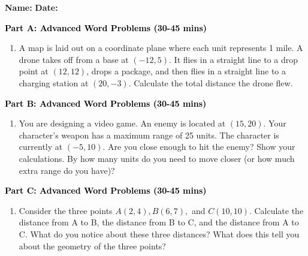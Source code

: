 \documentclass[12pt, letterpaper, fleqn]{article}
\begin{document}
\textbf{Name:} \underline{\hspace{5cm}}
\hfill
\textbf{Date:} \underline{\hspace{3cm}}\\


\begin{tcolorbox}[colback=customteal!20]
\large\textcolor{black}{\textbf{Part A: Advanced Word Problems (30-45 mins)}}
\end{tcolorbox}

\vspace{3mm}

\begin{enumerate}[itemsep=5.5cm, leftmargin=0.6cm]
\item A map is laid out on a coordinate plane where each unit represents 1 mile. A drone takes off from a base at $(-12, 5)$. It flies in a straight line to a drop point at $(12, 12)$, drops a package, and then flies in a straight line to a charging station at $(20, -3)$. Calculate the total distance the drone flew.
\end{enumerate}

\newpage

\begin{tcolorbox}[colback=customteal!20]
\large\textcolor{black}{\textbf{Part B: Advanced Word Problems (30-45 mins)}}
\end{tcolorbox}

\vspace{3mm}

\begin{enumerate}[itemsep=5.5cm, leftmargin=0.6cm, resume]
\item You are designing a video game. An enemy is located at $(15, 20)$. Your character's weapon has a maximum range of 25 units. The character is currently at $(-5, 10)$. Are you close enough to hit the enemy? Show your calculations. By how many units do you need to move closer (or how much extra range do you have)?
\end{enumerate}

\newpage

\begin{tcolorbox}[colback=customteal!20]
\large\textcolor{black}{\textbf{Part C: Advanced Word Problems (30-45 mins)}}
\end{tcolorbox}

\vspace{3mm}

\begin{enumerate}[itemsep=5.5cm, leftmargin=0.6cm, resume]
\item Consider the three points $A(2, 4), B(6, 7),$ and $C(10, 10)$. Calculate the distance from A to B, the distance from B to C, and the distance from A to C. What do you notice about these three distances? What does this tell you about the geometry of the three points?
\end{enumerate}
\end{document}
